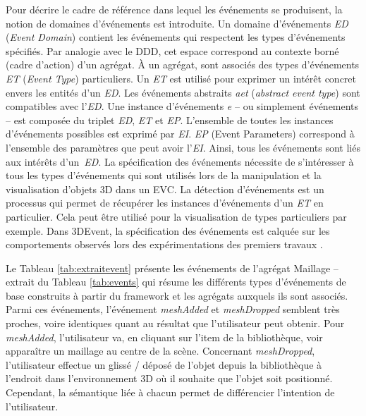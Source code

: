 Pour décrire le cadre de référence dans lequel les événements se produisent, la 
notion de domaines d'événements est introduite. Un domaine d'événements 
\textit{ED} (\textit{Event Domain}) contient les événements qui respectent les types 
d'événements spécifiés. Par analogie avec le \gls{DDD}, cet 
espace correspond au contexte borné (cadre d'action) d'un agrégat. À un agrégat, 
sont associés des types d'événements \textit{ET} (\textit{Event Type}) particuliers. 
Un \textit{ET} est utilisé pour exprimer un intérêt concret envers les entités d'un 
\textit{ED}. 
Les événements abstraits \textit{aet} (\textit{abstract event type}) sont 
compatibles avec l'\textit{ED}. 
Une instance d'événements \textit{e} -- ou simplement 
événements -- est composée du triplet \textit{ED}, \textit{ET} et \textit{EP}. 
L'ensemble de toutes les instances d'événements possibles est exprimé par 
\textit{EI}. \textit{EP} (Event Parameters) correspond à l'ensemble des paramètres 
que peut avoir l'\textit{EI}. Ainsi, tous les événements sont liés aux intérêts 
d'un~\textit{ED}. La spécification des événements nécessite de 
s'intéresser à tous les types d'événements qui sont utilisés lors de la manipulation 
et la visualisation d'objets \gls{3D} dans un \gls{EVC}. La détection d'événements 
est un processus qui permet de récupérer les instances d'événements d'un 
\textit{ET} en particulier. Cela peut être utilisé pour la visualisation de types
particuliers par exemple. Dans 3DEvent, la spécification des événements est calquée 
sur les comportements observés lors des expérimentations des premiers travaux 
\cite{Desprat2015a, Desprat2015b}. 

Le Tableau \ref{tab:extraitevent}
présente les événements de l'agrégat Maillage -- extrait du Tableau 
\ref{tab:events} qui résume les 
différents types d'événements de base construits à partir du \gls{framework} et les 
agrégats auxquels ils sont associés. Parmi ces événements, l'événement 
\textit{meshAdded} et \textit{meshDropped} semblent très proches, voire 
identiques quant au résultat que l'utilisateur peut obtenir. Pour \textit{meshAdded}, 
l'utilisateur va, en cliquant sur l'item de la bibliothèque, voir apparaître 
un maillage au centre de la scène. Concernant \textit{meshDropped}, 
l'utilisateur effectue un glissé / déposé de l'objet depuis la bibliothèque 
à l'endroit dans l'environnement 3D où il souhaite que l'objet soit positionné.
Cependant, la sémantique liée à chacun permet de différencier l'intention de l'utilisateur. 



